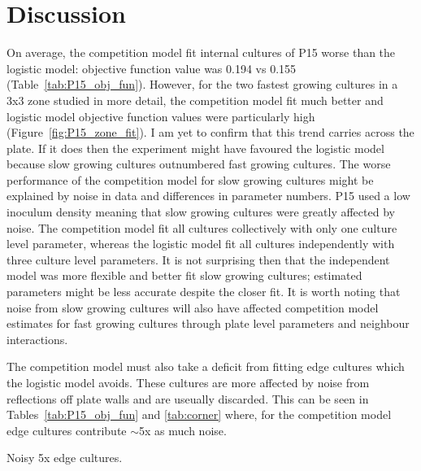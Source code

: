 \graphicspath{{images/}}

\section{Discussion}
\label{sec:discussion}


On average, the competition model fit internal cultures of P15 worse
than the logistic model: objective function value was 0.194 vs 0.155
(Table~\ref{tab:P15_obj_fun}). However, for the two fastest growing
cultures in a 3x3 zone studied in more detail, the competition model
fit much better and logistic model objective function values were
particularly high (Figure~\ref{fig:P15_zone_fit}). I am yet to confirm
that this trend carries across the plate. If it does then the
experiment might have favoured the logistic model because slow growing
cultures outnumbered fast growing cultures. The worse performance of
the competition model for slow growing cultures might be explained by
noise in data and differences in parameter numbers. P15 used a low
inoculum density meaning that slow growing cultures were greatly
affected by noise. The competition model fit all cultures collectively
with only one culture level parameter, whereas the logistic model fit
all cultures independently with three culture level parameters. It is
not surprising then that the independent model was more flexible and
better fit slow growing cultures; estimated parameters might be less
accurate despite the closer fit. It is worth noting that noise from
slow growing cultures will also have affected competition model
estimates for fast growing cultures through plate level parameters and
neighbour interactions.

The competition model must also take a deficit from fitting edge
cultures which the logistic model avoids. These cultures are more
affected by noise from reflections off plate walls and are useually
discarded. This can be seen in Tables~\ref{tab:P15_obj_fun} and
\ref{tab:corner} where, for the competition model edge cultures
contribute \(\sim\)5x as much noise.

Noisy 5x edge cultures.


